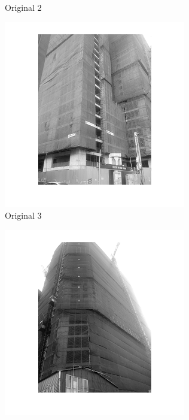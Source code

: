 \begin{center}
\begin{figure}[h]
\begin{subfigure}[b]{0.18\textwidth}
                \caption{Original 2}
                \label{fig:original 2}
        \end{subfigure}%
        \begin{subfigure}[b]{0.18\textwidth}
                \includegraphics[width=\linewidth]{construction3.png}
                 \caption{Original 3}
                  \label{fig:original 3}
        \end{subfigure}%
        \begin{subfigure}[b]{0.18\textwidth}
                \includegraphics[width=\linewidth]{construction4.png}

\end{subfigure}
\end{figure}
\end{center}
